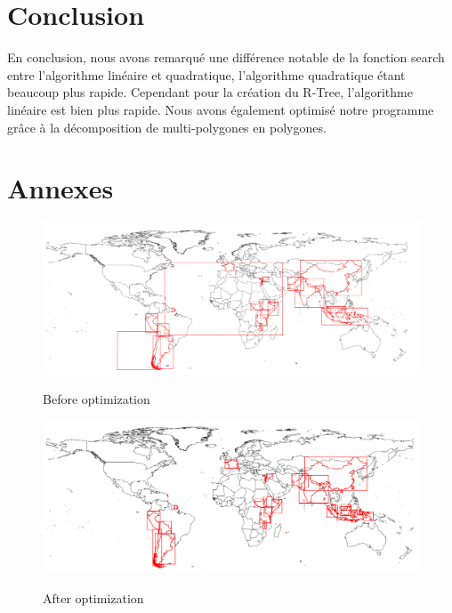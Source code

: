 \documentclass[utf8]{article}
\begin{document}
\begin{large}
    \section{Conclusion}
    \par
    \indent
    En conclusion, nous avons remarqué une différence notable de la fonction
    search entre l'algorithme linéaire et quadratique, l'algorithme quadratique
    étant beaucoup plus rapide. Cependant pour la création du R-Tree, l'algorithme
    linéaire est bien plus rapide. Nous avons également optimisé notre programme
    grâce à la décomposition de multi-polygones en polygones.
    \par
    \section{Annexes}
    \begin{figure}[h]
        \caption{Before optimization}\label{Figure 1}
        \includegraphics[width=\textwidth]{beforeopti.png}\label{fig:beforeopti}
    \end{figure}

    \begin{figure}[h]
        \caption{After optimization}\label{Figure 2}
        \includegraphics[width=\textwidth]{afterOpti.png}\label{fig:afteropti}
    \end{figure}

    \nocite{*}
    
    

\end{large}
\end{document}
